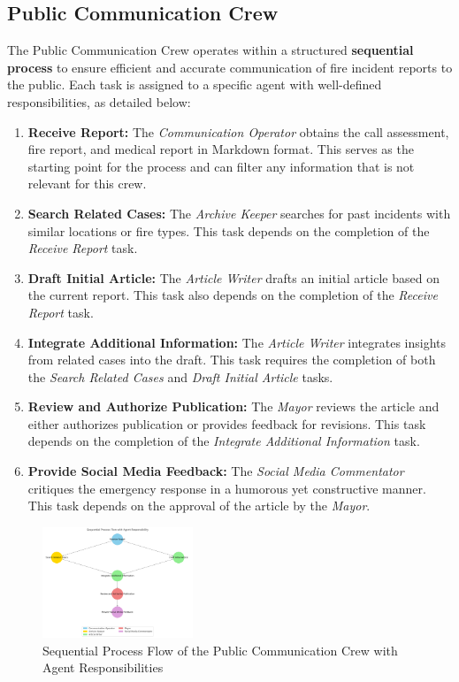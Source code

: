 \subsection{Public Communication Crew}

The Public Communication Crew operates within a structured \textbf{sequential process} to ensure efficient and accurate communication of fire incident reports to the public. Each task is assigned to a specific agent with well-defined responsibilities, as detailed below:

\begin{enumerate}
	\item \textbf{Receive Report:} The \textit{Communication Operator} obtains the call assessment, fire report, and medical report in Markdown format. This serves as the starting point for the process and can filter any information that is not relevant for this crew.
	\item \textbf{Search Related Cases:} The \textit{Archive Keeper} searches for past incidents with similar locations or fire types. This task depends on the completion of the \textit{Receive Report} task.
	\item \textbf{Draft Initial Article:} The \textit{Article Writer} drafts an initial article based on the current report. This task also depends on the completion of the \textit{Receive Report} task.
	\item \textbf{Integrate Additional Information:} The \textit{Article Writer} integrates insights from related cases into the draft. This task requires the completion of both the \textit{Search Related Cases} and \textit{Draft Initial Article} tasks.
	\item \textbf{Review and Authorize Publication:} The \textit{Mayor} reviews the article and either authorizes publication or provides feedback for revisions. This task depends on the completion of the \textit{Integrate Additional Information} task.
	\item \textbf{Provide Social Media Feedback:} The \textit{Social Media Commentator} critiques the emergency response in a humorous yet constructive manner. This task depends on the approval of the article by the \textit{Mayor}.
\end{enumerate}

\begin{figure}[ht!]
	\centering
	\includegraphics[width=0.4\textwidth]{figures/PC-process.png}
	\caption{Sequential Process Flow of the Public Communication Crew with Agent Responsibilities}
	\label{fig:public_comm_flow}
\end{figure}


